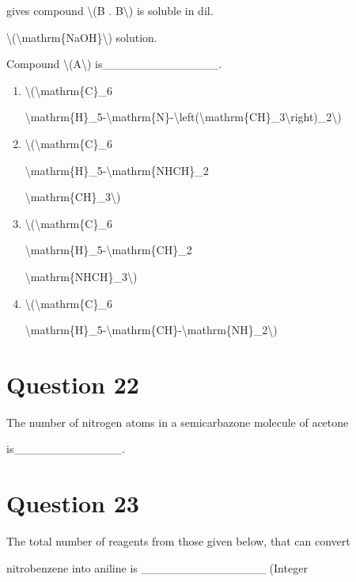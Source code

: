 \documentclass{article}
\begin{document}
gives compound \textbackslash(B . B\textbackslash) is soluble in dil.

\textbackslash(\textbackslash mathrm\{NaOH\}\textbackslash) solution.~



Compound \textbackslash(A\textbackslash) is\_\_\_\_\_\_\_\_\_\_\_\_\_\_.


\begin{enumerate}[label=(\alph*)]
\item \textbackslash(\textbackslash mathrm\{C\}\_6

\textbackslash mathrm\{H\}\_5-\textbackslash mathrm\{N\}-\textbackslash left(\textbackslash mathrm\{CH\}\_3\textbackslash right)\_2\textbackslash)


\item \textbackslash(\textbackslash mathrm\{C\}\_6

\textbackslash mathrm\{H\}\_5-\textbackslash mathrm\{NHCH\}\_2

\textbackslash mathrm\{CH\}\_3\textbackslash)


\item \textbackslash(\textbackslash mathrm\{C\}\_6

\textbackslash mathrm\{H\}\_5-\textbackslash mathrm\{CH\}\_2

\textbackslash mathrm\{NHCH\}\_3\textbackslash)


\item \textbackslash(\textbackslash mathrm\{C\}\_6

\textbackslash mathrm\{H\}\_5-\textbackslash mathrm\{CH\}-\textbackslash mathrm\{NH\}\_2\textbackslash)


\end{enumerate}
\newpage
\section*{Question 22}
The number of nitrogen atoms in a semicarbazone molecule of acetone

is\_\_\_\_\_\_\_\_\_\_\_\_\_.


\begin{enumerate}[label=(\alph*)]
\end{enumerate}
\newpage
\section*{Question 23}
The total number of reagents from those given below, that can convert

nitrobenzene into aniline is \_\_\_\_\_\_\_\_\_\_\_\_\_\_\_ (Integer
\end{document}
